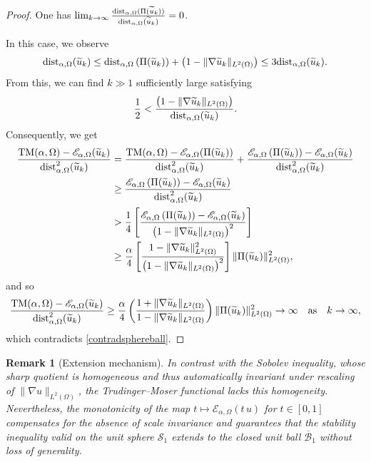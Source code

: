 \documentclass[reqno,11pt]{amsart}
\newtheorem{remark}[theorem]{Remark}
\theoremstyle{definition}
\begin{document}
\begin{proof}
 One has $\lim_{k \rightarrow \infty}\frac{{\rm dist}_{\alpha,\Omega}(\Pi(\widetilde{u}_k))}{{\rm dist}_{\alpha,\Omega}(\widetilde{u}_k)}=0$.

\noindent In this case, we observe 
\[
{\rm dist}_{\alpha,\Omega}(\widetilde{u}_k)\leq {\rm dist}_{\alpha,\Omega}\left(\Pi(\widetilde{u}_k)\right)+\left(1-\|\nabla \widetilde{u}_k\|_{L^2(\Omega)}\right)\leq 3 {\rm dist}_{\alpha,\Omega}(\widetilde{u}_k).
\]
From this, we can find $k\gg1$ sufficiently large satisfying
\[
\frac{1}{2}< \frac{\left(1-\|\nabla \widetilde{u}_k\|_{L^2(\Omega)}\right)}{{\rm dist}_{\alpha,\Omega}(\widetilde{u}_k)}.
\]
Consequently, we get
\begin{align*}
    \frac{{\rm TM}({\alpha},\Omega) - \mathscr{E}_{\alpha, \Omega} (\widetilde{u}_k)}{{\rm dist}_{\alpha,\Omega}^2(\widetilde{u}_k)}&=\frac{{\rm TM}({\alpha},\Omega) - \mathscr{E}_{\alpha, \Omega} (\Pi(\widetilde{u}_k))}{{\rm dist}_{\alpha,\Omega}^2(\widetilde{u}_k)}+\frac{\mathscr{E}_{\alpha, \Omega} \left( \Pi(\widetilde{u}_k)\right) - \mathscr{E}_{\alpha, \Omega} (\widetilde{u}_k)}{{\rm dist}_{\alpha,\Omega}^2(\widetilde{u}_k)}\\
    &\geq \frac{\mathscr{E}_{\alpha, \Omega} \left( \Pi(\widetilde{u}_k)\right) - \mathscr{E}_{\alpha, \Omega} (\widetilde{u}_k)}{{\rm dist}_{\alpha,\Omega}^2(\widetilde{u}_k)}\\
    &> \frac{1}{4}\left[\frac{\mathscr{E}_{\alpha, \Omega} \left( \Pi(\widetilde{u}_k)\right) - \mathscr{E}_{\alpha, \Omega} (\widetilde{u}_k)}{\left(1-\|\nabla \widetilde{u}_k\|_{L^2(\Omega)}\right)^2}\right]\\
    &\ge \frac{\alpha}{4}\left[\frac{1-\|\nabla \widetilde{u}_k\|_{L^2(\Omega)}^2}{\left(1-\|\nabla \widetilde{u}_k\|_{L^2(\Omega)}\right)^2}\right]\|\Pi(\widetilde{u}_k)\|_{L^2(\Omega)}^2,
\end{align*}
and so
\[
\frac{{\rm TM}({\alpha},\Omega) - \mathscr{E}_{\alpha, \Omega} (\widetilde{u}_k)}{{\rm dist}_{\alpha,\Omega}^2(\widetilde{u}_k)}\ge \frac{\alpha}{4}\left(\frac{1+\|\nabla \widetilde{u}_k\|_{L^2(\Omega)}}{1-\|\nabla \widetilde{u}_k\|_{L^2(\Omega)}}\right)\|\Pi(\widetilde{u}_k)\|_{L^2(\Omega)}^2\rightarrow \infty \quad {\rm as} \quad k \to \infty,
\]
which contradicts \eqref{contradsphereball}.
\end{proof}

\begin{remark}[Extension mechanism]
\label{rmk:sphere-to-ball}
In contrast with the Sobolev inequality, whose sharp quotient is homogeneous and
thus automatically invariant under rescaling of $\|\nabla u\|_{L^2(\Omega)}$,
the Trudinger--Moser functional lacks this homogeneity.
Nevertheless, the monotonicity of the map
$t\mapsto\mathscr{E}_{\alpha,\Omega}(t\,u)$ for $t\in[0,1]$
compensates for the absence of scale invariance and guarantees that the stability
inequality valid on the unit sphere $\mathcal{S}_1$ extends to the closed unit ball
$\overline{\mathcal{B}}_1$ without loss of generality.
\end{remark}
\end{document}
